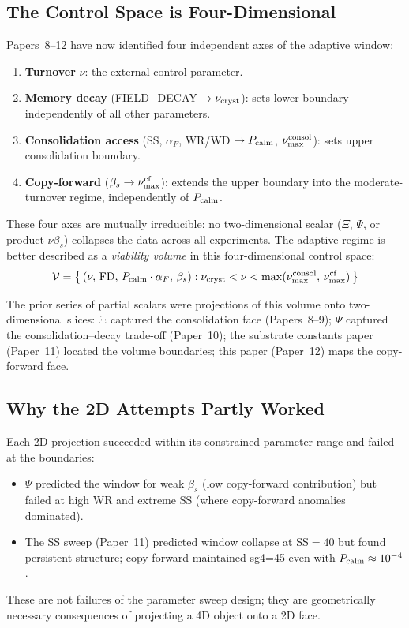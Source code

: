 \documentclass[11pt]{article}
\begin{document}
\subsection{The Control Space is Four-Dimensional}

Papers~8--12 have now identified four independent axes of the adaptive window:

\begin{enumerate}
\item \textbf{Turnover} $\nu$: the external control parameter.
\item \textbf{Memory decay} (FIELD\_DECAY $\to \nu_{\rm cryst}$): sets lower
    boundary independently of all other parameters.
\item \textbf{Consolidation access} (SS, $\alpha_F$, WR/WD $\to P_{\rm calm}$,
    $\nu_{\rm max}^{\rm consol}$): sets upper consolidation boundary.
\item \textbf{Copy-forward} ($\beta_s \to \nu_{\rm max}^{\rm cf}$): extends
    the upper boundary into the moderate-turnover regime, independently of
    $P_{\rm calm}$.
\end{enumerate}

These four axes are mutually irreducible: no two-dimensional scalar
($\Xi$, $\Psi$, or product $\nu\beta_s$) collapses the data across all experiments.
The adaptive regime is better described as a \emph{viability volume} in
this four-dimensional control space:
\[
\mathcal{V} = \bigl\{\,(\nu,\,\text{FD},\,P_{\rm calm}\cdot\alpha_F,\,\beta_s)
: \nu_{\rm cryst} < \nu
< \max(\nu_{\rm max}^{\rm consol},\,\nu_{\rm max}^{\rm cf})
\,\bigr\}
\]

The prior series of partial scalars were projections of this volume onto
two-dimensional slices:
$\Xi$ captured the consolidation face (Papers~8--9);
$\Psi$ captured the consolidation--decay trade-off (Paper~10);
the substrate constants paper (Paper~11) located the volume boundaries;
this paper (Paper~12) maps the copy-forward face.

\subsection{Why the 2D Attempts Partly Worked}

Each 2D projection succeeded within its constrained parameter range and
failed at the boundaries:
\begin{itemize}
\item $\Psi$ predicted the window for weak $\beta_s$ (low copy-forward contribution)
  but failed at high WR and extreme SS (where copy-forward anomalies dominated).
\item The SS sweep (Paper~11) predicted window collapse at SS$=40$ but found
  persistent structure; copy-forward maintained sg4=45 even with $P_{\rm
  calm} \approx 10^{-4}$.
\end{itemize}
These are not failures of the parameter sweep design; they are geometrically
necessary consequences of projecting a 4D object onto a 2D face.
\end{document}
